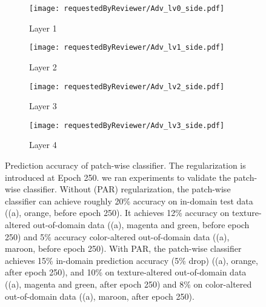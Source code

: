 \documentclass{article}
\begin{document}
\begin{figure}[h!]
  \centering
    \begin{subfigure}{.49\textwidth}
      \centering
      \texttt{[image: requestedByReviewer/Adv\_lv0\_side.pdf]}
      \caption{Layer 1}
      \label{process}
    \end{subfigure}
    \begin{subfigure}{.49\textwidth}
      \centering
      \texttt{[image: requestedByReviewer/Adv\_lv1\_side.pdf]}
      \caption{Layer 2}
    \end{subfigure}
    \begin{subfigure}{.49\textwidth}
      \centering
      \texttt{[image: requestedByReviewer/Adv\_lv2\_side.pdf]}
      \caption{Layer 3}
    \end{subfigure}
    \begin{subfigure}{.49\textwidth}
      \centering
      \texttt{[image: requestedByReviewer/Adv\_lv3\_side.pdf]}
      \caption{Layer 4}
    \end{subfigure}
\caption{Prediction accuracy of patch-wise classifier. The regularization is introduced at Epoch 250. we ran experiments
to validate the patch-wise classifier.
Without (PAR) regularization, the patch-wise classifier can achieve roughly 20\% accuracy on in-domain test data 
((a), orange, before epoch 250).
It achieves 12\% accuracy on texture-altered out-of-domain data ((a), magenta and green, before epoch 250)
and 5\% accuracy color-altered out-of-domain data ((a), maroon, before epoch 250). 
With PAR, the patch-wise classifier achieves 15\% in-domain prediction accuracy (5\% drop) 
((a), orange, after epoch 250), 
and 10\% on texture-altered out-of-domain data 
((a), magenta and green, after epoch 250) 
and 8\% on color-altered out-of-domain data ((a), maroon, after epoch 250). }
\label{fig:reviewer}
\end{figure}

\clearpage
\end{document}
